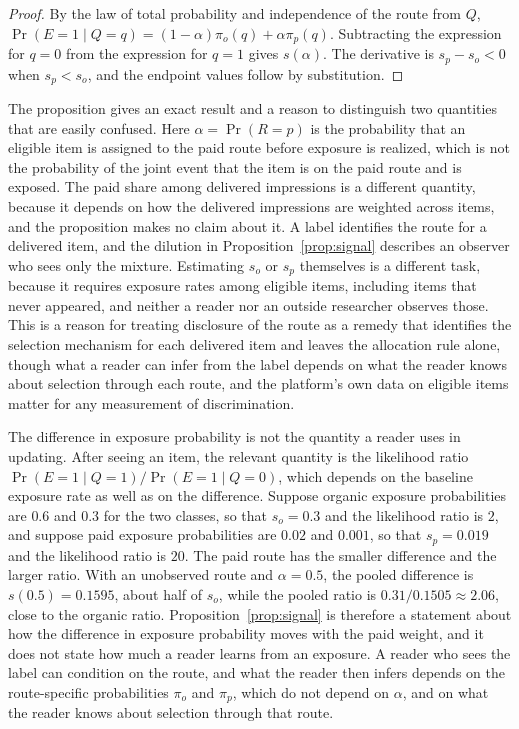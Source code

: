 \documentclass[11pt]{article}
\theoremstyle{definition}
\begin{document}
\begin{proof}
By the law of total probability and independence of the route from $Q$, $\Pr(E=1\mid Q=q)=(1-\alpha)\pi_o(q)+\alpha\pi_p(q)$. Subtracting the expression for $q=0$ from the expression for $q=1$ gives $s(\alpha)$. The derivative is $s_p-s_o<0$ when $s_p<s_o$, and the endpoint values follow by substitution.
\end{proof}

The proposition gives an exact result and a reason to distinguish two quantities that are easily confused. Here $\alpha=\Pr(R=p)$ is the probability that an eligible item is assigned to the paid route before exposure is realized, which is not the probability of the joint event that the item is on the paid route and is exposed. The paid share among delivered impressions is a different quantity, because it depends on how the delivered impressions are weighted across items, and the proposition makes no claim about it. A label identifies the route for a delivered item, and the dilution in Proposition~\ref{prop:signal} describes an observer who sees only the mixture. Estimating $s_o$ or $s_p$ themselves is a different task, because it requires exposure rates among eligible items, including items that never appeared, and neither a reader nor an outside researcher observes those. This is a reason for treating disclosure of the route as a remedy that identifies the selection mechanism for each delivered item and leaves the allocation rule alone, though what a reader can infer from the label depends on what the reader knows about selection through each route, and the platform's own data on eligible items matter for any measurement of discrimination.

The difference in exposure probability is not the quantity a reader uses in updating. After seeing an item, the relevant quantity is the likelihood ratio $\Pr(E=1\mid Q=1)/\Pr(E=1\mid Q=0)$, which depends on the baseline exposure rate as well as on the difference. Suppose organic exposure probabilities are $0.6$ and $0.3$ for the two classes, so that $s_o=0.3$ and the likelihood ratio is $2$, and suppose paid exposure probabilities are $0.02$ and $0.001$, so that $s_p=0.019$ and the likelihood ratio is $20$. The paid route has the smaller difference and the larger ratio. With an unobserved route and $\alpha=0.5$, the pooled difference is $s(0.5)=0.1595$, about half of $s_o$, while the pooled ratio is $0.31/0.1505\approx 2.06$, close to the organic ratio. Proposition~\ref{prop:signal} is therefore a statement about how the difference in exposure probability moves with the paid weight, and it does not state how much a reader learns from an exposure. A reader who sees the label can condition on the route, and what the reader then infers depends on the route-specific probabilities $\pi_o$ and $\pi_p$, which do not depend on $\alpha$, and on what the reader knows about selection through that route.
\end{document}
